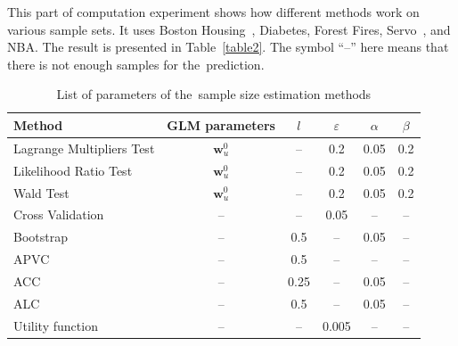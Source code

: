 \documentclass[
11pt,%
tightenlines,%
twoside,%
onecolumn,%
nofloats,%
nobibnotes,%
nofootinbib,%
superscriptaddress,%
noshowpacs,%
centertags]%
{revtex4}
\begin{document}
This part of computation experiment shows how different methods work on various sample sets. It uses Boston Housing~\cite{boston}, Diabetes, Forest Fires, Servo~\cite{servo}, and NBA.
The result is presented in Table~\ref{table2}. The symbol ``--'' here means that there is not enough samples for the~prediction.

\begin{table}[h!bp]
\caption{List of parameters of the~sample size estimation methods}
\label{table3}
\begin{tabular}{l|c|c|c|c|c}
\hline 
Method& GLM parameters& $l$& $\varepsilon$	& $\alpha$& $\beta$\\ 
\hline	
Lagrange	Multipliers Test	& $\mathbf{w}_{u}^0$	& -- & 0.2& 0.05& 0.2\\
\hline	
Likelihood Ratio Test			& $\mathbf{w}_{u}^0$	& -- & 0.2& 0.05& 0.2\\
\hline	
Wald	Test							& $\mathbf{w}_{u}^0$	& -- & 0.2& 0.05& 0.2\\
\hline	
Cross Validation 				& -- & -- 	& 0.05& -- & --\\
\hline	
Bootstrap 							& -- & 0.5	& -- & 0.05& --\\
\hline	
APVC 									& -- & 0.5	& -- & -- & --\\
\hline	
ACC 									& -- & 0.25	& -- & 0.05& --\\
\hline	
ALC 										& -- & 0.5	& -- & 0.05& --\\
\hline	
Utility function 					& -- & -- 	& 0.005& -- & --\\
\hline
\end{tabular}
\end{table}
\end{document}
